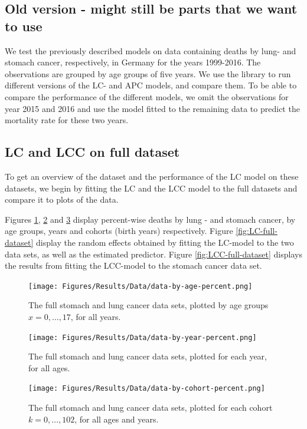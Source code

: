 \newpage 
\newpage
\newpage
\subsection{Old version - might still be parts that we want to use}
We test the previously described models on data containing deaths by lung- and stomach cancer, respectively, in Germany for the years 1999-2016. The observations are grouped by age groups of five years. We use the \inlabru library to run different versions of the LC- and APC models, and compare them. To be able to compare the performance of the different models, we omit the observations for year 2015 and 2016 and use the model fitted to the remaining data to predict the mortality rate for these two years. 

\subsection{LC and LCC on full dataset}
To get an overview of the dataset and the performance of the LC model on these datasets, we begin by fitting the LC and the LCC model to the full datasets and compare it to plots of the data. 

Figures \ref{fig:data-by-age}, \ref{fig:data-by-year} and \ref{fig:data-by-cohort} display percent-wise deaths by lung - and stomach cancer, by age groups, years and cohorts (birth years) respectively. Figure \ref{fig:LC-full-dataset} display the random effects obtained by fitting the LC-model to the two data sets, as well as the estimated predictor. Figure \ref{fig:LCC-full-dataset} displays the results from fitting the LCC-model to the stomach cancer data set. 

\begin{figure}[h!]
    \centering
    \texttt{[image: Figures/Results/Data/data-by-age-percent.png]}
    \caption{The full stomach and lung cancer data sets, plotted by age groups $x = 0,\ldots,17$, for all years. }
    \label{fig:data-by-age}
\end{figure}

\begin{figure}[h!]
    \centering
    \texttt{[image: Figures/Results/Data/data-by-year-percent.png]}
    \caption{The full stomach and lung cancer data sets, plotted for each year, for all ages. }
    \label{fig:data-by-year}
\end{figure}

\begin{figure}[h!]
    \centering
    \texttt{[image: Figures/Results/Data/data-by-cohort-percent.png]}
    \caption{The full stomach and lung cancer data sets, plotted for each cohort $k = 0,\ldots,102$, for all ages and years.}
    \label{fig:data-by-cohort}
\end{figure}


